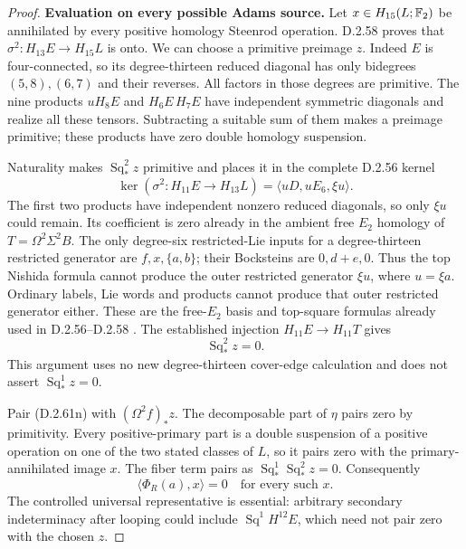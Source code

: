 \begin{proof}
\medskip\noindent
\textbf{Evaluation on every possible Adams source.}
Let $x\in H_{15}(L;\mathbb F_2)$ be annihilated by every
positive homology Steenrod operation.
D.2.58 proves that $\sigma^2:H_{13}E\to H_{15}L$
is onto.  We can choose a primitive preimage $z$.
Indeed $E$ is four-connected, so its degree-thirteen
reduced diagonal has only bidegrees $(5,8),(6,7)$
and their reverses.  All factors in those degrees are
primitive.  The nine products
$uH_8E$ and $H_6E\,H_7E$ have independent symmetric
diagonals and realize all these tensors.  Subtracting
a suitable sum of them makes a preimage primitive;
these products have zero double homology suspension.

Naturality makes $\operatorname{Sq}^2_*z$ primitive
and places it in the complete D.2.56 kernel
\[
 \ker(\sigma^2:H_{11}E\to H_{13}L)
                    =\langle uD,uE_6,\xi u\rangle.
 \tag{D.2.61o}
\]
The first two products have independent nonzero
reduced diagonals, so only $\xi u$ could remain.
Its coefficient is zero already in the ambient free
$E_2$ homology of $T=\Omega^2\Sigma^2B$.
The only degree-six restricted-Lie inputs for a
degree-thirteen restricted generator are $f,x,\{a,b\}$;
their Bocksteins are $0,d+e,0$.
Thus the top Nishida formula cannot produce the outer
restricted generator $\xi u$, where $u=\xi a$.
Ordinary labels, Lie words and products cannot produce
that outer restricted generator either.
These are the free-$E_2$ basis and top-square formulas
already used in D.2.56--D.2.58
\cite[Chapter~III, Theorem~1.3(3), pp.~217--218]{I_CohenLadaMay1976}.
The established injection $H_{11}E\to H_{11}T$ gives
\[
                         \operatorname{Sq}^2_*z=0.
                         \tag{D.2.61p}
\]
This argument uses no new degree-thirteen cover-edge
calculation and does not assert $\operatorname{Sq}^1_*z=0$.

Pair \textup{(D.2.61n)} with $(\Omega^2f)_*z$.
The decomposable part of $\eta$ pairs zero by primitivity.
Every positive-primary part is a double suspension of
a positive operation on one of the two stated classes
of $L$, so it pairs zero with the primary-annihilated
image $x$.  The fiber term pairs as
$\operatorname{Sq}^1_*\operatorname{Sq}^2_*z=0$.
Consequently
\[
             \langle\Phi_R(a),x\rangle=0
            \quad\text{for every such }x.
             \tag{D.2.61q}
\]
The controlled universal representative is essential:
arbitrary secondary indeterminacy after looping could
include $\operatorname{Sq}^1H^{12}E$, which need not
pair zero with the chosen $z$.


\end{proof}
